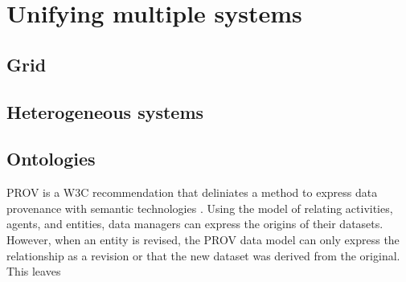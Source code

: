 \section{Unifying multiple systems}
\subsection{Grid}
\subsection{Heterogeneous systems}
\subsection{Ontologies}

PROV is a W3C recommendation that deliniates a method to express data provenance with semantic technologies \cite{Belhajjame2013}.
Using the model of relating activities, agents, and entities, data managers can express the origins of their datasets.
However, when an entity is revised, the PROV data model can only express the relationship as a revision or that the new dataset was derived from the original.
This leaves



